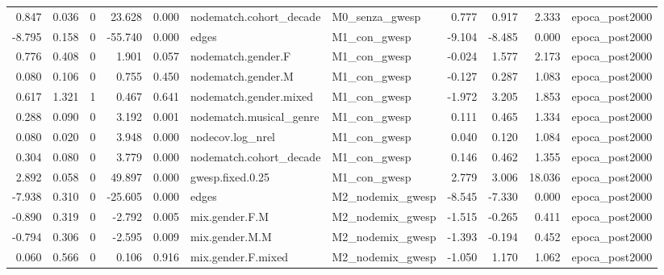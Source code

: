 \begin{table}
\begin{tabular}{rrrrrllrrrl}
    0.847 & 0.036 &        0 &   23.628 &     0.000 & nodematch.cohort\_decade &   M0\_senza\_gwesp &   0.777 &   0.917 &   2.333 &              epoca\_post2000 \\
   -8.795 & 0.158 &        0 &  -55.740 &     0.000 &                   edges &     M1\_con\_gwesp &  -9.104 &  -8.485 &   0.000 &              epoca\_post2000 \\
    0.776 & 0.408 &        0 &    1.901 &     0.057 &      nodematch.gender.F &     M1\_con\_gwesp &  -0.024 &   1.577 &   2.173 &              epoca\_post2000 \\
    0.080 & 0.106 &        0 &    0.755 &     0.450 &      nodematch.gender.M &     M1\_con\_gwesp &  -0.127 &   0.287 &   1.083 &              epoca\_post2000 \\
    0.617 & 1.321 &        1 &    0.467 &     0.641 &  nodematch.gender.mixed &     M1\_con\_gwesp &  -1.972 &   3.205 &   1.853 &              epoca\_post2000 \\
    0.288 & 0.090 &        0 &    3.192 &     0.001 & nodematch.musical\_genre &     M1\_con\_gwesp &   0.111 &   0.465 &   1.334 &              epoca\_post2000 \\
    0.080 & 0.020 &        0 &    3.948 &     0.000 &        nodecov.log\_nrel &     M1\_con\_gwesp &   0.040 &   0.120 &   1.084 &              epoca\_post2000 \\
    0.304 & 0.080 &        0 &    3.779 &     0.000 & nodematch.cohort\_decade &     M1\_con\_gwesp &   0.146 &   0.462 &   1.355 &              epoca\_post2000 \\
    2.892 & 0.058 &        0 &   49.897 &     0.000 &        gwesp.fixed.0.25 &     M1\_con\_gwesp &   2.779 &   3.006 &  18.036 &              epoca\_post2000 \\
   -7.938 & 0.310 &        0 &  -25.605 &     0.000 &                   edges & M2\_nodemix\_gwesp &  -8.545 &  -7.330 &   0.000 &              epoca\_post2000 \\
   -0.890 & 0.319 &        0 &   -2.792 &     0.005 &          mix.gender.F.M & M2\_nodemix\_gwesp &  -1.515 &  -0.265 &   0.411 &              epoca\_post2000 \\
   -0.794 & 0.306 &        0 &   -2.595 &     0.009 &          mix.gender.M.M & M2\_nodemix\_gwesp &  -1.393 &  -0.194 &   0.452 &              epoca\_post2000 \\
    0.060 & 0.566 &        0 &    0.106 &     0.916 &      mix.gender.F.mixed & M2\_nodemix\_gwesp &  -1.050 &   1.170 &   1.062 &              epoca\_post2000 \\

\end{tabular}
\end{table}
